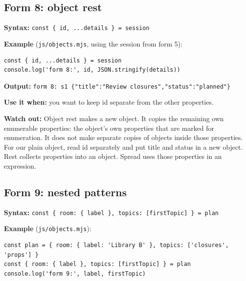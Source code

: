 \documentclass[
  10pt,
  a4paper,
]{article}
\begin{document}
\subsection{Form 8: object rest}\label{form-8-object-rest}

\textbf{Syntax:}
\texttt{const \{ id, .\allowbreak{}.\allowbreak{}.\allowbreak{}details \} = session}

\textbf{Example} (\texttt{js/\allowbreak{}objects.\allowbreak{}mjs},
using the session from form 5):

\begin{minipage}{\linewidth}

\begin{lstlisting}
const { id, ...details } = session
console.log('form 8:', id, JSON.stringify(details))
\end{lstlisting}

\end{minipage}\par

\textbf{Output:}
\texttt{form 8:\allowbreak{} s1 \{"title":\allowbreak{}"Review closures","status":\allowbreak{}"planned"\}}

\textbf{Use it when:} you want to keep id separate from the other
properties.

\textbf{Watch out:} Object rest makes a new object. It copies the
remaining own enumerable properties: the object's own properties that
are marked for enumeration. It does not make separate copies of objects
inside those properties. For our plain object, read id separately and
put title and status in a new object. Rest collects properties into an
object. Spread uses those properties in an expression.

\subsection{Form 9: nested patterns}\label{form-9-nested-patterns}

\textbf{Syntax:}
\texttt{const \{ room:\allowbreak{} \{ label \}, topics:\allowbreak{} [firstTopic] \} = plan}

\textbf{Example} (\texttt{js/\allowbreak{}objects.\allowbreak{}mjs}):

\begin{minipage}{\linewidth}

\begin{lstlisting}
const plan = { room: { label: 'Library B' }, topics: ['closures', 'props'] }
const { room: { label }, topics: [firstTopic] } = plan
console.log('form 9:', label, firstTopic)
\end{lstlisting}

\end{minipage}\par
\end{document}
